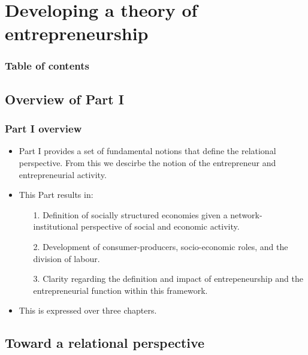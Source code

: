 \documentclass[9pt]{beamer}
\begin{document}
\section{Developing a theory of entrepreneurship}

\begin{frame}
\frametitle{Table of contents}
\tableofcontents[currentsection]
\end{frame}

\subsection{Overview of Part I}

\begin{frame} \frametitle{Part I overview}
\begin{itemize}
\item Part I provides a set of fundamental notions that define the relational perspective. From this we descirbe the notion of the entrepreneur and entrepreneurial activity.
\medskip
\item This Part results in:
\begin{itemize}
\medskip
\item[1.] Definition of socially structured economies given a network-institutional perspective of social and economic activity.
\medskip
\item[2.] Development of consumer-producers, socio-economic roles, and the division of labour.
\medskip
\item[3.] Clarity regarding the definition and impact of entrepeneurship and the entrepreneurial function within this framework.
\end{itemize}
\medskip
\item This is expressed over three chapters.
\end{itemize}
\end{frame}

\subsection{Toward a relational perspective}
\end{document}
